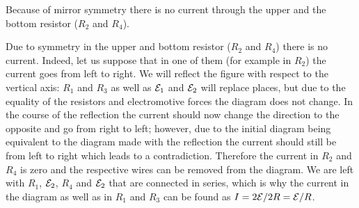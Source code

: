 \hinteng
Because of mirror symmetry there is no current through the upper and the bottom resistor ($R_2$ and $R_4$).

\solueng
Due to symmetry in the upper and bottom resistor ($R_2$ and $R_4$) there is no current. Indeed, let us suppose that in one of them (for example in $R_2$) the current goes from left to right. We will reflect the figure with respect to the vertical axis: $R_1$ and $R_3$ as well as ${\cal E}_1$ and ${\cal E}_2$ will replace places, but due to the equality of the resistors and electromotive forces the diagram does not change. In the course of the reflection the current should now change the direction to the opposite and go from right to left; however, due to the initial diagram being equivalent to the diagram made with the reflection the current should still be from left to right which leads to a contradiction. Therefore the current in $R_2$ and $R_4$ is zero and the respective wires can be removed from the diagram. We are left with $R_1$, ${\cal E}_2$, $R_4$ and ${\cal E}_2$ that are connected in series, which is why the current in the diagram as well as in $R_1$ and $R_3$ can be found as $I=2{\cal E}/2R = {\cal E}/R$.
\probend